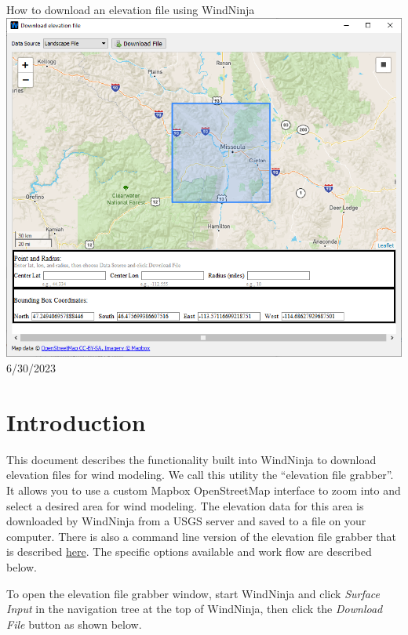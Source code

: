 \documentclass[12pt]{article}
\begin{document}
\begin{titlepage}
    \centering
    {\Huge
       How to download an elevation file using WindNinja
    }    
    \vfill
    \includegraphics[scale=0.75]{dem_download_0}
    \vfill
  	{\Huge
	  6/30/2023 %
  	}
    \vfill
\end{titlepage}


\section*{Introduction}
This document describes the functionality built into WindNinja to download
elevation files for wind modeling.  We call this utility the “elevation file
grabber”.  It allows you to use a custom \textcopyright Mapbox \textcopyright OpenStreetMap interface to zoom into
and select a desired area for wind modeling. The elevation data for this area
is downloaded by WindNinja from a USGS server and saved to a file on your
computer.  There is also a command line version of the elevation file grabber
that is described \href{https://weather.firelab.org/windninja/tutorials/fetch_dem_instructions.pdf}{here}.  The specific
options available and work flow are described below.

To open the elevation file grabber window, start WindNinja and click \textit{Surface Input} in the navigation tree at the top of WindNinja, then click the \textit{Download File} button as shown below.
\end{document}
